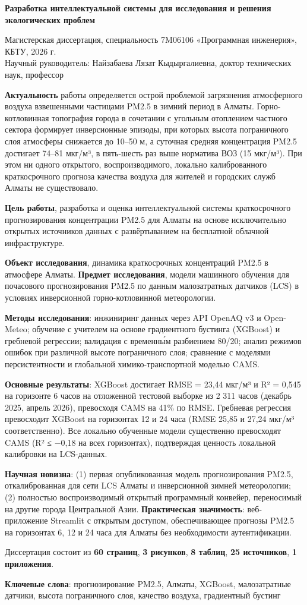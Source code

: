 \textbf{Разработка интеллектуальной системы для исследования и решения экологических проблем}

Магистерская диссертация, специальность 7M06106 «Программная инженерия», КБТУ, 2026 г.\\
Научный руководитель: Найзабаева Лязат Кыдыргалиевна, доктор технических наук, профессор

\textbf{Актуальность} работы определяется острой проблемой загрязнения атмосферного воздуха взвешенными частицами PM2.5 в зимний период в Алматы. Горно-котловинная топография города в сочетании с угольным отоплением частного сектора формирует инверсионные эпизоды, при которых высота пограничного слоя атмосферы снижается до 10--50 м, а суточная средняя концентрация PM2.5 достигает 74--81 мкг/м³, в пять-шесть раз выше норматива ВОЗ (15 мкг/м³). При этом ни одного открытого, воспроизводимого, локально калиброванного краткосрочного прогноза качества воздуха для жителей и городских служб Алматы не существовало.

\textbf{Цель работы}, разработка и оценка интеллектуальной системы краткосрочного прогнозирования концентрации PM2.5 для Алматы на основе исключительно открытых источников данных с развёртыванием на бесплатной облачной инфраструктуре.

\textbf{Объект исследования}, динамика краткосрочных концентраций PM2.5 в атмосфере Алматы. \textbf{Предмет исследования}, модели машинного обучения для почасового прогнозирования PM2.5 по данным малозатратных датчиков (LCS) в условиях инверсионной горно-котловинной метеорологии.

\textbf{Методы исследования}: инжиниринг данных через API OpenAQ v3 и Open-Meteo; обучение с учителем на основе градиентного бустинга (XGBoost) и гребневой регрессии; валидация с временны́м разбиением 80/20; анализ режимов ошибок при различной высоте пограничного слоя; сравнение с моделями персистентности и глобальной химико-транспортной моделью CAMS.

\textbf{Основные результаты}: XGBoost достигает RMSE = 23,44 мкг/м³ и R² = 0,545 на горизонте 6 часов на отложенной тестовой выборке из 2 311 часов (декабрь 2025, апрель 2026), превосходя CAMS на 41\% по RMSE. Гребневая регрессия превосходит XGBoost на горизонтах 12 и 24 часа (RMSE 25,85 и 27,24 мкг/м³ соответственно). Все локально обученные модели существенно превосходят CAMS (R² ≤ −0,18 на всех горизонтах), подтверждая ценность локальной калибровки на LCS-данных.

\textbf{Научная новизна}: (1) первая опубликованная модель прогнозирования PM2.5, откалиброванная для сети LCS Алматы и инверсионной зимней метеорологии; (2) полностью воспроизводимый открытый программный конвейер, переносимый на другие города Центральной Азии. \textbf{Практическая значимость}: веб-приложение Streamlit с открытым доступом, обеспечивающее прогнозы PM2.5 на горизонтах 6, 12 и 24 часа для Алматы без необходимости аутентификации.

Диссертация состоит из \textbf{60 страниц}, \textbf{3 рисунков}, \textbf{8 таблиц}, \textbf{25 источников}, \textbf{1 приложения}.

\textbf{Ключевые слова}: прогнозирование PM2.5, Алматы, XGBoost, малозатратные датчики, высота пограничного слоя, качество воздуха, градиентный бустинг
